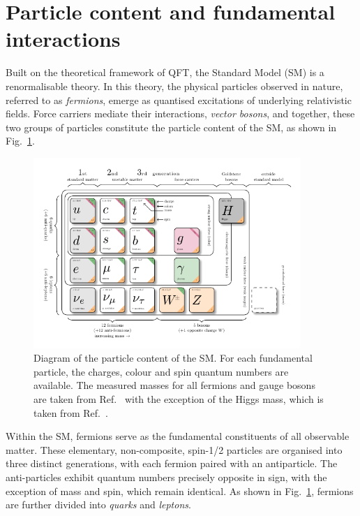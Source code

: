 \section{Particle content and fundamental interactions}
\label{Section:Particle content and fundamental interactions}
Built on the theoretical framework of \ac{QFT}, the Standard Model (SM) is a renormalisable theory. In this theory, the physical particles observed in nature, referred to as \textit{fermions}, emerge as quantised excitations of underlying relativistic fields. Force carriers mediate their interactions, \textit{vector bosons}, and together, these two groups of particles constitute the particle content of the SM, as shown in Fig.~\ref{Figure:Introduction_1}.

\begin{figure}[ht]
\centering
\includegraphics[width= 0.9\textwidth]{Figures/Introduction/Particles.pdf}
\caption[Diagram of the particle content of the SM]{Diagram of the particle content of the SM. For each fundamental particle, the charges, colour and spin quantum numbers are available. The measured masses for all fermions and gauge bosons are taken from Ref.~\cite{ParticleMasses} with the exception of the Higgs mass, which is taken from Ref.~\cite{Higgs_Mass}.}
\label{Figure:Introduction_1}
\end{figure}

Within the SM, fermions serve as the fundamental constituents of all observable matter. These elementary, non-composite, spin-1/2 particles are organised into three distinct generations, with each fermion paired with an antiparticle. The anti-particles exhibit quantum numbers precisely opposite in sign, with the exception of mass and spin, which remain identical. As shown in Fig.~\ref{Figure:Introduction_1}, fermions are further divided into \textit{quarks} and \textit{leptons}. 

